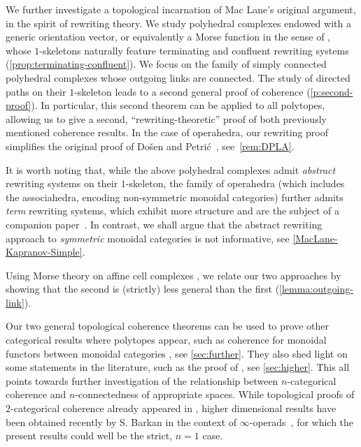 \smallskip
We further investigate a topological incarnation of Mac Lane's original argument, in the spirit of rewriting theory.  
We study polyhedral complexes endowed with a generic orientation vector, or equivalently a Morse function in the sense of \cite{bestvinaMorseTheoryFiniteness1997}, whose $1$-skeletons naturally feature terminating and confluent rewriting systems (\cref{prop:terminating-confluent}).
We focus on the family of simply connected polyhedral complexes whose outgoing links are connected. 
The study of directed paths on their $1$-skeleton leads to a second general proof of coherence (\cref{p:second-proof}).
In particular, this second theorem can be applied to all polytopes, allowing us to give a second, ``rewriting-theoretic'' proof of both previously mentioned coherence results.  
In the case of operahedra, our rewriting proof simplifies the original proof of Do{\v s}en and Petri{\'c}~\cite{DP15}, see~\cref{rem:DPLA}.

It is worth noting that, while the above polyhedral complexes admit \emph{abstract} rewriting systems on their $1$-skeleton,
the family of operahedra (which includes the associahedra, encoding non-symmetric monoidal categories) further admits \emph{term} rewriting systems, which exhibit more structure and are the subject of a companion paper~\cite{CLA24}. In contrast, we shall argue that the abstract rewriting approach to \emph{symmetric} monoidal categories is not informative, see \cref{MacLane-Kapranov-Simple}.

Using Morse theory on affine cell complexes \cite{bestvinaMorseTheoryFiniteness1997}, we relate our two approaches by showing that the second is (strictly) less general than the first (\cref{lemma:outgoing-link}).
 
\smallskip
Our two general topological coherence theorems can be used to prove other categorical results where polytopes appear, such as coherence for monoidal functors between monoidal categories \cite{epsteinFunctorsTensoredCategories1966}, see \cref{sec:further}.
They also shed light on some statements in the literature, such as the proof of \cite[Prop.~3.9]{KapranovVoevodsky94}, see \cref{sec:higher}.
This all points towards further investigation of the relationship between $n$-categorical coherence and $n$-connectedness of appropriate spaces.
While topological proofs of $2$-categorical coherence already appeared in \cite{Gurski11}, higher dimensional results have been obtained recently by S. Barkan in the context of $\infty$-operads~\cite{barkanArityApproximationInfty2022}, for which the present results could well be the strict, $n=1$ case.

